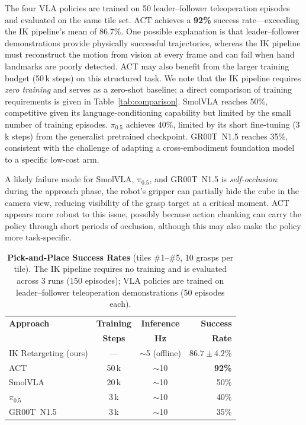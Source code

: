 \documentclass{ieeeaccess}
\begin{document}
The four VLA policies are trained on 50 leader--follower teleoperation
episodes and evaluated on the same tile set. ACT achieves a
\textbf{92\%} success rate---exceeding the IK pipeline's mean of
86.7\%. One possible explanation is that leader--follower demonstrations
provide physically successful trajectories, whereas the IK pipeline
must reconstruct the motion from vision at every frame and can fail
when hand landmarks are poorly detected. ACT may also benefit from
the larger training budget (50\,k steps) on this structured task.
We note that the IK pipeline requires \emph{zero training} and
serves as a zero-shot baseline; a direct comparison of training
requirements is given in Table~\ref{tab:comparison}.
SmolVLA reaches 50\%, competitive
given its language-conditioning capability but limited by the
small number of training episodes. $\pi_{0.5}$ achieves 40\%, limited
by its short fine-tuning (3\,k steps) from the generalist pretrained
checkpoint. GR00T~N1.5 reaches 35\%, consistent with the challenge of
adapting a cross-embodiment foundation model to a specific low-cost arm.

A likely failure mode for SmolVLA, $\pi_{0.5}$, and GR00T~N1.5
is \emph{self-occlusion}: during the approach phase, the robot's
gripper can partially hide the cube in the camera view, reducing
visibility of the grasp target at a critical moment. ACT appears more
robust to this issue, possibly because action chunking can carry the
policy through short periods of occlusion, although this may also make
the policy more task-specific.

\begin{table}[t]
\caption{\textbf{Pick-and-Place Success Rates} (tiles \#1--\#5, 10 grasps
  per tile). The IK pipeline requires no training and is evaluated
  across 3 runs (150 episodes); VLA policies are trained on
  leader--follower teleoperation demonstrations (50 episodes each).}
\label{tab:successrates}
\centering
\begin{tabular}{lccr}
\hline
\textbf{Approach} & \textbf{Training} & \textbf{Inference} & \textbf{Success} \\
                   & \textbf{Steps}    & \textbf{Hz}        & \textbf{Rate} \\
\hline
IK Retargeting (ours) & ---           & ${\sim}$5 (offline) & $86.7 \pm 4.2$\% \\
ACT~\cite{zhao2023act}          & 50\,k  & ${\sim}$10 & \textbf{92\%} \\
SmolVLA~\cite{cadena2025smolvla} & 20\,k  & ${\sim}$10 & 50\% \\
$\pi_{0.5}$~\cite{black2024pi0} & 3\,k   & ${\sim}$10 & 40\% \\
GR00T~N1.5            & 3\,k          & ${\sim}$10 & 35\% \\
\hline
\end{tabular}
\end{table}
\end{document}
